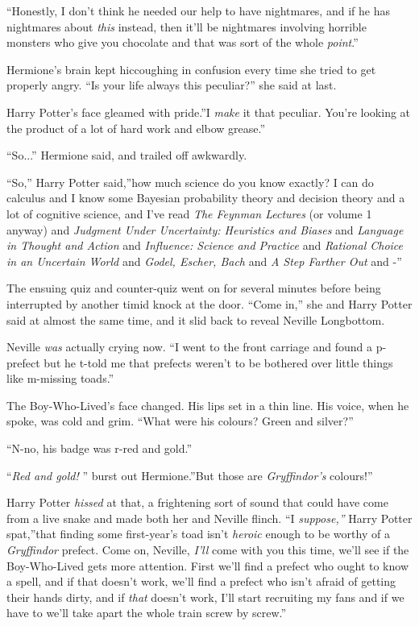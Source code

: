 ``Honestly, I don't think he needed our help to have nightmares, and if
he has nightmares about \emph{this} instead, then it'll be nightmares
involving horrible monsters who give you chocolate and that was sort of
the whole \emph{point}.''

Hermione's brain kept hiccoughing in confusion every time she tried to
get properly angry. ``Is your life always this peculiar?'' she said at
last.

Harry Potter's face gleamed with pride.''I \emph{make} it that peculiar.
You're looking at the product of a lot of hard work and elbow grease.''

``So...'' Hermione said, and trailed off awkwardly.

``So,'' Harry Potter said,''how much science do you know exactly? I can
do calculus and I know some Bayesian probability theory and decision
theory and a lot of cognitive science, and I've read \emph{The Feynman
Lectures} (or volume 1 anyway) and \emph{Judgment Under Uncertainty:
Heuristics and Biases} and \emph{Language in Thought and Action} and
\emph{Influence: Science and Practice} and \emph{Rational Choice in an
Uncertain World} and \emph{Godel, Escher, Bach} and \emph{A Step Farther
Out} and -''

The ensuing quiz and counter-quiz went on for several minutes before
being interrupted by another timid knock at the door. ``Come in,'' she
and Harry Potter said at almost the same time, and it slid back to
reveal Neville Longbottom.

Neville \emph{was} actually crying now. ``I went to the front carriage
and found a p-prefect but he t-told me that prefects weren't to be
bothered over little things like m-missing toads.''

The Boy-Who-Lived's face changed. His lips set in a thin line. His
voice, when he spoke, was cold and grim. ``What were his colours? Green
and silver?''

``N-no, his badge was r-red and gold.''

``\emph{Red and gold!} '' burst out Hermione.''But those are
\emph{Gryffindor's} colours!''

Harry Potter \emph{hissed} at that, a frightening sort of sound that
could have come from a live snake and made both her and Neville flinch.
``I \emph{suppose,''} Harry Potter spat,''that finding some first-year's
toad isn't \emph{heroic} enough to be worthy of a \emph{Gryffindor}
prefect. Come on, Neville, \emph{I'll} come with you this time, we'll
see if the Boy-Who-Lived gets more attention. First we'll find a prefect
who ought to know a spell, and if that doesn't work, we'll find a
prefect who isn't afraid of getting their hands dirty, and if
\emph{that} doesn't work, I'll start recruiting my fans and if we have
to we'll take apart the whole train screw by screw.''

